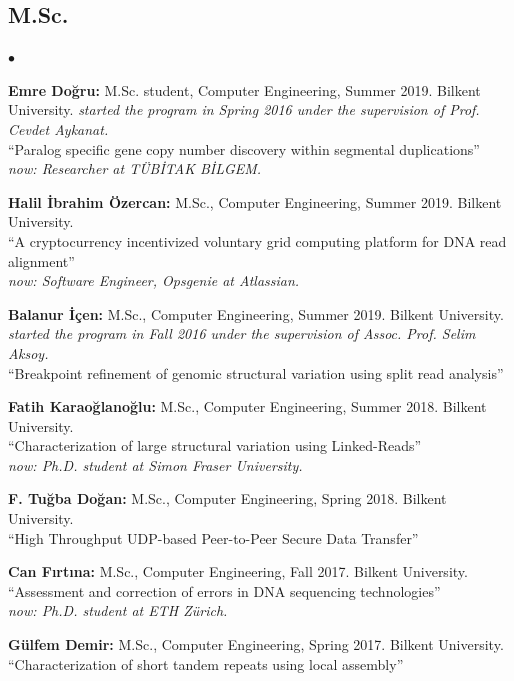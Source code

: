 \documentclass[margin,line]{res}
\newenvironment{list2}{
  \begin{list}{$\bullet$}{%
      \setlength{\itemsep}{0.1cm}
      \setlength{\parsep}{0in} \setlength{\parskip}{0in}
      \setlength{\topsep}{0in} \setlength{\partopsep}{0in} 
      \setlength{\leftmargin}{0.2in}}}{\end{list}}
\begin{document}
\begin{resume}
\subsection{\small \sc M.Sc.}
\begin{list2}
\item
  {\bf Emre Doğru:} M.Sc. student, Computer Engineering, Summer 2019.
  Bilkent University. {\it started the program in Spring 2016 under the supervision of Prof. Cevdet Aykanat.}\\
  ``Paralog specific gene copy number discovery within segmental duplications''\\
  {\it now: Researcher at TÜBİTAK BİLGEM.}
\item
  {\bf Halil İbrahim Özercan:} M.Sc., Computer Engineering, Summer 2019.
  Bilkent University. \\
  ``A cryptocurrency incentivized voluntary grid computing platform for DNA read alignment''\\
  {\it now: Software Engineer, Opsgenie at Atlassian.}
\item
  {\bf Balanur İçen:} M.Sc., Computer Engineering, Summer 2019.
  Bilkent University. {\it started the program in Fall 2016 under the supervision of Assoc. Prof. Selim Aksoy.}\\
  ``Breakpoint refinement of genomic structural variation using split read analysis''
\item
  {\bf Fatih Karaoğlanoğlu:} M.Sc., Computer Engineering, Summer 2018.
  Bilkent University. \\
  ``Characterization of large structural variation using Linked-Reads''\\
  {\it now: Ph.D. student at Simon Fraser University.}
\item
  {\bf F. Tuğba Doğan:} M.Sc., Computer Engineering, Spring 2018.
  Bilkent University. \\
  ``High Throughput UDP-based Peer-to-Peer Secure Data Transfer''
\item
  {\bf Can Fırtına:} M.Sc., Computer Engineering,  Fall 2017.
  Bilkent University. \\
  ``Assessment and correction of errors in DNA sequencing technologies''\\
  {\it now: Ph.D. student at ETH Zürich.}
\item
  {\bf Gülfem Demir:} M.Sc., Computer Engineering, Spring 2017.
  Bilkent University. \\
  ``Characterization of short tandem repeats using local assembly''\\

\end{list2}
\end{resume}
\end{document}
